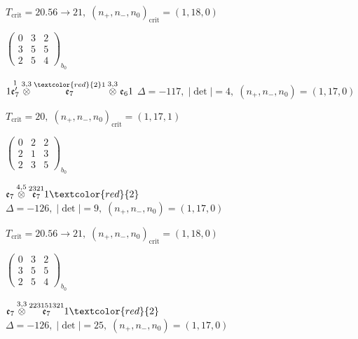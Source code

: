 \documentclass[10pt]{article}
\begin{document}
\hspace{1em}$T_{\text{crit}}=20.56 \to 21,\; (n_+,n_-,n_0)_{\text{crit}}=(1,18,0)$

\hspace{2em}$\left(\begin{smallmatrix}0 & 3 & 2 \\ 3 & 5 & 5 \\ 2 & 5 & 4\end{smallmatrix}\right)_{\!b_0}$

\smallskip

$1\overset{1}{\mathfrak{e}_7'}\overset{3,3}{\otimes}\overset{\textcolor{red}{2}1}{\mathfrak{e}_7}\overset{3,3}{\otimes}\mathfrak{e}_61$ \quad $\Delta=-117,\; |\det|=4,\; (n_+,n_-,n_0)=(1,17,0)$

\hspace{1em}$T_{\text{crit}}=20,\; (n_+,n_-,n_0)_{\text{crit}}=(1,17,1)$

\hspace{2em}$\left(\begin{smallmatrix}0 & 2 & 2 \\ 2 & 1 & 3 \\ 2 & 3 & 5\end{smallmatrix}\right)_{\!b_0}$

\smallskip

$\mathfrak{e}_7\overset{4,5}{\otimes}\overset{2321}{\mathfrak{e}_7}1\textcolor{red}{2}$ \quad $\Delta=-126,\; |\det|=9,\; (n_+,n_-,n_0)=(1,17,0)$

\hspace{1em}$T_{\text{crit}}=20.56 \to 21,\; (n_+,n_-,n_0)_{\text{crit}}=(1,18,0)$

\hspace{2em}$\left(\begin{smallmatrix}0 & 3 & 2 \\ 3 & 5 & 5 \\ 2 & 5 & 4\end{smallmatrix}\right)_{\!b_0}$

\smallskip

$\mathfrak{e}_7\overset{3,3}{\otimes}\overset{223151321}{\mathfrak{e}_7}1\textcolor{red}{2}$ \quad $\Delta=-126,\; |\det|=25,\; (n_+,n_-,n_0)=(1,17,0)$
\end{document}
